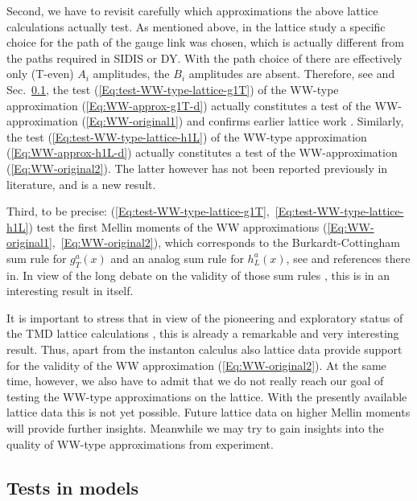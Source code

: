\documentclass[a4paper,11pt]{article}
\begin{document}
Second, we have to revisit carefully which approximations the above
lattice calculations actually test. As mentioned above, in
the lattice study \cite{Hagler:2007xi} a specific choice for
the path of the gauge link was chosen, which is actually different
from the paths required in SIDIS or DY. With the path choice of
\cite{Hagler:2007xi} there are effectively only (T-even)
$A_i$ amplitudes, the $B_i$ amplitudes are absent.
Therefore, see \cite{Metz:2008ib,Teckentrup:2009tk} and
Sec.~\ref{Sec-3.6:models},
the test (\ref{Eq:test-WW-type-lattice-g1T}) of the WW-type
approximation (\ref{Eq:WW-approx-g1T-d}) actually constitutes a test
of the WW-approximation (\ref{Eq:WW-original1}) and confirms
earlier lattice work \cite{Gockeler:2000ja,Gockeler:2005vw}.
Similarly, the test (\ref{Eq:test-WW-type-lattice-h1L}) of the
WW-type approximation (\ref{Eq:WW-approx-h1L-d}) actually constitutes
a test of the WW-approximation (\ref{Eq:WW-original2}). The latter
however has not been reported previously in literature, and is a
new result.

Third, to be precise:
(\ref{Eq:test-WW-type-lattice-g1T},~\ref{Eq:test-WW-type-lattice-h1L})
test the first Mellin moments of the WW approximations
(\ref{Eq:WW-original1},~\ref{Eq:WW-original2}), which corresponds to the
Burkardt-Cottingham sum rule for $g_T^a(x)$ and an analog sum rule for
$h_L^a(x)$, see \cite{Jaffe:1996zw} and references there in.
In view of the long debate on the validity of those sum rules
\cite{Burkardt:2001iy,Bass:2003vp,Efremov:2002qh}, this is in
an interesting result in itself.

It is important to stress that in view of the pioneering and
exploratory status of the TMD lattice calculations
\cite{Hagler:2007xi}, this is already a remarkable and very
interesting result. Thus, apart from the instanton calculus
\cite{Dressler:1999hc} also lattice data provide support for
the validity of the WW approximation (\ref{Eq:WW-original2}).
At the same time, however, we also have to admit that we do
not really reach our goal of testing the WW-type approximations
on the lattice. With the presently available lattice data
this is not yet possible. Future lattice data on higher
Mellin moments will provide further insights.
Meanwhile we may try to gain insights into the quality of
WW-type approximations from experiment.

\subsection{Tests in models}
\label{Sec-3.6:models}
\end{document}
